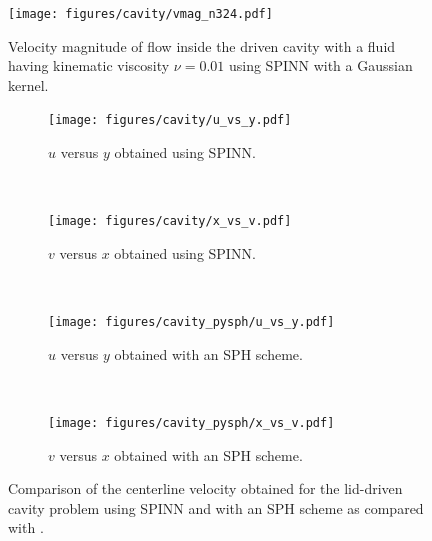 \documentclass[12pt]{article}
\newcommand{\rb}[1]{#1}
\begin{document}
\begin{figure}
\texttt{[image: figures/cavity/vmag\_n324.pdf]}
\caption{Velocity magnitude of flow inside the driven cavity
 with a fluid having kinematic viscosity $\nu=0.01$ using SPINN with a Gaussian kernel.
}
\label{fig:ldc_velocity}
\end{figure}

\begin{figure}
\begin{subfigure}{0.49\textwidth}
\texttt{[image: figures/cavity/u\_vs\_y.pdf]}
\caption{$u$ versus $y$ obtained using SPINN.}
\label{fig:ldc_u_vs_y}
\end{subfigure}
~
\begin{subfigure}{0.49\textwidth}
\texttt{[image: figures/cavity/x\_vs\_v.pdf]}
\caption{$v$ versus $x$ obtained using SPINN.}
\label{fig:ldc_v_vs_x}
\end{subfigure}
~
\begin{subfigure}{0.49\textwidth}
\texttt{[image: figures/cavity\_pysph/u\_vs\_y.pdf]}
\caption{$u$ versus $y$ obtained with an SPH scheme.}
\label{fig:ldc_u_vs_y_pysph}
\end{subfigure}
~
\begin{subfigure}{0.49\textwidth}
\texttt{[image: figures/cavity\_pysph/x\_vs\_v.pdf]}
\caption{$v$ versus $x$ obtained with an SPH scheme.}
\label{fig:ldc_v_vs_x_pysph}
\end{subfigure}

\caption{\rb{Comparison of the centerline velocity obtained for the lid-driven cavity problem using SPINN and with an SPH scheme as compared with \cite{ldc:ghia}.}}
\label{fig:ldc}
\end{figure}
\end{document}
